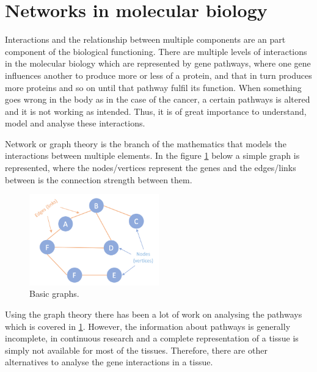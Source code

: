 \section{Networks in molecular biology}

Interactions and the relationship between multiple components are an part component of the biological functioning. There are multiple levels of interactions in the molecular biology which are represented by gene pathways, where one gene influences another to produce more or less of a protein, and that in turn produces more proteins and so on until that pathway fulfil its function. When something goes wrong in the body as in the case of the cancer, a certain pathways is altered and it is not working as intended. Thus, it is of great importance to understand, model and analyse these interactions.

Network or graph theory is the branch of the mathematics that models the interactions between multiple elements. In the figure \ref{fig:lit:basic_net} below a simple graph is represented, where the nodes/vertices represent the genes and the edges/links between is the connection strength between them. 

\begin{figure}[!htb]
  \centering\includegraphics[width=0.5\textwidth,height=0.5\textheight,keepaspectratio]{Sections/Lit_review/Resources/basic_graphs.png}
    \caption{Basic graphs.}
    \label{fig:lit:basic_net}
\end{figure}
\FloatBarrier

Using the graph theory there has been a lot of work on analysing the pathways which is covered in \ref{}. However, the information about pathways is generally incomplete, in continuous research and a complete representation of a tissue is simply not available for most of the tissues. Therefore, there are other alternatives to analyse the gene interactions in a tissue.

